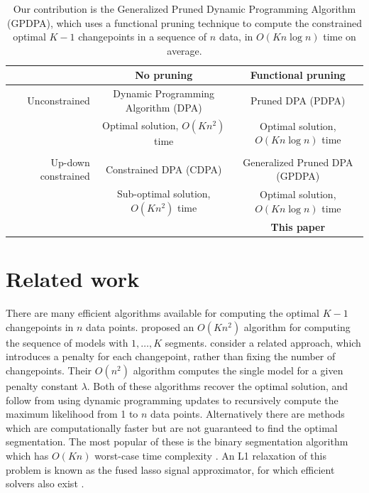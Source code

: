 \documentclass{article}
\begin{document}
\begin{table}[b!]
  \centering
  \begin{tabular}{r|c|c}
    & No pruning & Functional pruning \\
    \hline
    Unconstrained & Dynamic Programming Algorithm (DPA) & Pruned DPA (PDPA) \\
    & Optimal solution, $O(Kn^2)$ time & Optimal solution, $O(Kn\log n)$ time\\
    & \citet{segment-neighborhood, optimal-partitioning}     & \citet{pruned-dp, johnson} \\
    \hline
    Up-down constrained & Constrained DPA (CDPA) & Generalized Pruned DPA (GPDPA) \\
    & Sub-optimal solution, $O(Kn^2)$ time & Optimal solution, $O(Kn\log n)$ time\\
    & \citet{HOCKING-PeakSeg} & \textbf{This paper} \\
    \hline
  \end{tabular}
  \caption{Our contribution is 
the Generalized Pruned Dynamic Programming Algorithm (GPDPA), 
 which uses a functional pruning technique 
    to compute the constrained optimal $K-1$ changepoints 
in a sequence of $n$ data, in $O(K n\log n)$ time on average.}
\label{tab:contribution}
\end{table}

\section{Related work}
\label{sec:related}

There are many efficient algorithms available for computing the
optimal $K-1$ changepoints in $n$ data
points. \citet{segment-neighborhood} proposed an $O(K n^2)$ algorithm
for computing the sequence of models with $1,\dots,K$ segments.
\citet{optimal-partitioning} consider a related approach, which
introduces a penalty for each changepoint, rather than fixing the
number of changepoints. Their $O(n^2)$ algorithm computes the single
model for a given penalty constant $\lambda$. Both of these algorithms
recover the optimal solution, and follow from using dynamic
programming updates \citep{bellman} to recursively compute the maximum
likelihood from 1 to $n$ data points. Alternatively there are methods
which are computationally faster but are not guaranteed to find the
optimal segmentation. The most popular of these is the binary
segmentation algorithm which has $O(Kn)$ worst-case time complexity
\citep{binary-segmentation}. An L1 relaxation of this problem is known
as the fused lasso signal approximator, for which efficient solvers
also exist \citep{flsa}.
\end{document}
